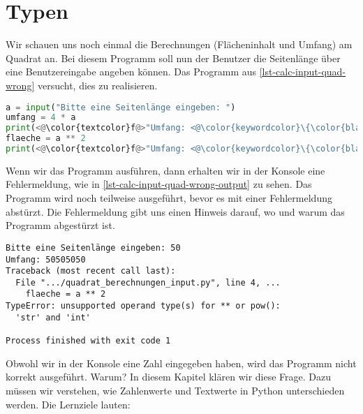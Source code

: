 
\toggletrue{image}
\toggletrue{imagehover}

\chapter{Typen}
\label{chapter-typen}

Wir schauen uns noch einmal die Berechnungen (Flächeninhalt und Umfang) am Quadrat an. Bei diesem Programm soll nun der Benutzer die Seitenlänge über eine Benutzereingabe angeben können. Das Programm aus \autoref{lst-calc-input-quad-wrong} versucht, dies zu realisieren.

\begin{lstlisting}[language=python, caption={\graybgtexttt{quadrat\_berechnungen\_input.py}}, label=lst-calc-input-quad-wrong]
a = input("Bitte eine Seitenlänge eingeben: ")
umfang = 4 * a
print(<@\color{textcolor}f@>"Umfang: <@\color{keywordcolor}\{\color{black}umfang\color{keywordcolor}\}@>")
flaeche = a ** 2
print(<@\color{textcolor}f@>"Umfang: <@\color{keywordcolor}\{\color{black}flaeche\color{keywordcolor}\}@>")
\end{lstlisting}

Wenn wir das Programm ausführen, dann erhalten wir in der Konsole eine Fehlermeldung, wie in \autoref{lst-calc-input-quad-wrong-output} zu sehen. Das Programm wird noch teilweise ausgeführt, bevor es mit einer Fehlermeldung abstürzt. Die Fehlermeldung gibt uns einen Hinweis darauf, wo und warum das Programm abgestürzt ist.

\begin{lstlisting}[language=output, label={lst-calc-input-quad-wrong-output}, caption={Konsolenausgabe des fehlerhaften Programms.}]
Bitte eine Seitenlänge eingeben: 50
Umfang: 50505050
Traceback (most recent call last):
  File ".../quadrat_berechnungen_input.py", line 4, ...
    flaeche = a ** 2
TypeError: unsupported operand type(s) for ** or pow(): 
  'str' and 'int'

Process finished with exit code 1
\end{lstlisting}

Obwohl wir in der Konsole eine Zahl eingegeben haben, wird das Programm nicht korrekt ausgeführt. Warum? In diesem Kapitel klären wir diese Frage. Dazu müssen wir verstehen, wie Zahlenwerte und Textwerte in Python unterschieden werden. Die Lernziele lauten:

